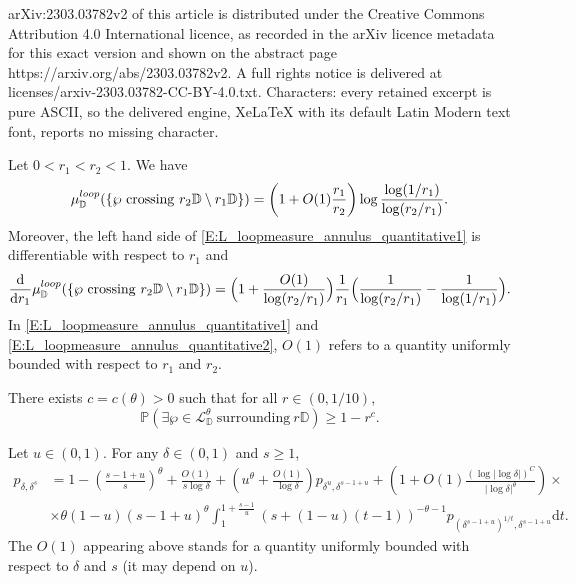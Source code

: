 \documentclass[10pt,a4paper]{amsart}
\def \loopmeasure{\mu^{\rm loop}}
\newcommand{\D}{\mathbb{D}}
\newcommand{\Lc}{\mathcal{L}}
\newcommand{\Prob}[1]{\mathbb{P} \left( #1 \right) }
\renewcommand{\d}{\mathrm{d}}
\begin{document}
arXiv:2303.03782v2 of this article is distributed under the Creative Commons Attribution 4.0 International licence, as recorded in the arXiv licence metadata for this exact version and shown on the abstract page https://arxiv.org/abs/2303.03782v2. A full rights notice is delivered at licenses/arxiv-2303.03782-CC-BY-4.0.txt. Characters: every retained excerpt is pure ASCII, so the delivered engine, XeLaTeX with its default Latin Modern text font, reports no missing character.
\begin{lemma}\label{L:loopmeasure_annulus_quantitative}
Let $0<r_1<r_2<1$. We have
\begin{equation}
\label{E:L_loopmeasure_annulus_quantitative1}
\loopmeasure_\D ( \{ \wp \mathrm{~crossing~} r_2 \D \setminus r_1 \D \} ) = \left( 1 + O(1)\frac{r_1}{r_2} \right) \log \frac{\log (1/r_1)}{\log (r_2/r_1)}.
\end{equation}
Moreover, the left hand side of \eqref{E:L_loopmeasure_annulus_quantitative1} is differentiable with respect to $r_1$ and
\begin{equation}
\label{E:L_loopmeasure_annulus_quantitative2}
\frac{\d}{\d r_1} \loopmeasure_\D ( \{ \wp \mathrm{~crossing~} r_2 \D \setminus r_1 \D \} ) = \Big( 1 + \frac{O(1)}{\log(r_2/r_1)} \Big) \frac{1}{r_1} \Big( \frac{1}{\log(r_2/r_1)} - \frac{1}{\log(1/r_1)} \Big).
\end{equation}
In \eqref{E:L_loopmeasure_annulus_quantitative1} and \eqref{E:L_loopmeasure_annulus_quantitative2}, $O(1)$ refers to a quantity uniformly bounded with respect to $r_1$ and $r_2$.
\end{lemma}

\begin{lemma}\label{L:surround}
There exists $c = c(\theta)>0$ such that for all $r \in (0,1/10)$,
\begin{equation}
\Prob{ \exists \wp \in \Lc_\D^\theta \mathrm{~surrounding~} r \D } \geq 1 - r^c.
\end{equation}
\end{lemma}

\begin{lemma}\label{L:crossing_equation_sub}
Let $u \in (0,1)$. For any $\delta \in (0,1)$ and $s \geq 1$,
\begin{align*}
p_{\delta,\delta^s}
& = 1 - \left( \frac{s-1+u}{s} \right)^\theta + \frac{O(1)}{s \log \delta}
+ \left( u^\theta + \frac{O(1)}{\log \delta} \right) p_{\delta^u, \delta^{s-1+u}} + \left( 1 + O(1)\frac{(\log |\log \delta|)^C}{|\log \delta|^\theta} \right) \times \\
& \times \theta (1-u) (s-1+u)^\theta
\int_1^{1 + \frac{s-1}{u}} (s + (1-u)(t-1))^{-\theta-1} p_{(\delta^{s-1+u})^{1/t},\delta^{s-1+u}} \d t.
\end{align*}
The $O(1)$ appearing above stands for a quantity uniformly bounded with respect to $\delta$ and $s$ (it may depend on $u$).
\end{lemma}
\end{document}
